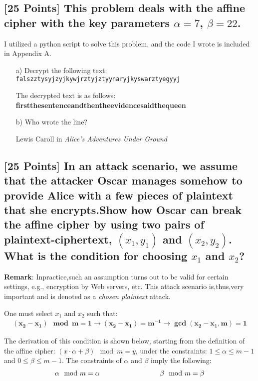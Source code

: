 \documentclass{article}
\begin{document}
\subsection{[25 Points] This problem deals with the affine cipher with the key parameters $\alpha = 7$, $\beta = 22$.}
I utilized a python script to solve this problem, and the code I wrote is included in Appendix A.
\begin{enumerate}
    \setlength{\itemsep}{10pt}%
    \item[a)] Decrypt the following text: \texttt{falszztysyjzyjkywjrztyjztyynaryjkyswarztyegyyj}
    
    The decrypted text is as follows:  \textbf{firstthesentenceandthentheevidencesaidthequeen}
    \item[b)] Who wrote the line?
    
    Lewis Caroll in \textit{Alice's Adventures Under Ground}
    \item[]
\end{enumerate}

\setcounter{subsection}{12}
\newpage
\subsection{[25 Points] In an attack scenario, we assume that the attacker Oscar manages somehow to provide Alice with a few pieces of plaintext that she encrypts.Show how Oscar can break the affine cipher by using two pairs of plaintext-ciphertext, $(x_1 ,y_1)$ and $(x_2 ,y_2)$. What is the condition for choosing $x_1$ and $x_2$?}

\textbf{Remark}:  Inpractice,such an assumption turns out to be valid for certain settings, e.g., encryption by Web servers, etc. This attack scenario is,thus,very important and is denoted as a \emph{chosen plaintext} attack.
\vspace{.5 cm}

One must select $x_1$ and $x_2$ such that: 
\begin{align*}
\mathbf{(x_2 - x_1) \mod m = 1 \rightarrow (x_2 - x_1) = m^{-1} \rightarrow \boxed{\gcd (x_2-x_1, m) = 1}}
\end{align*}

The derivation of this condition is shown below, starting from the definition of the affine cipher: $(x \cdot \alpha + \beta) \mod m = y$, under the constraints: $1 \leq \alpha \leq m-1$ and $0 \leq \beta \leq m-1$.  
The constraints of $\alpha$ and $\beta$ imply the following:
\begin{align*}
\alpha \mod m = \alpha \hspace{.25\textwidth} \beta \mod m = \beta 
\end{align*}
\end{document}
